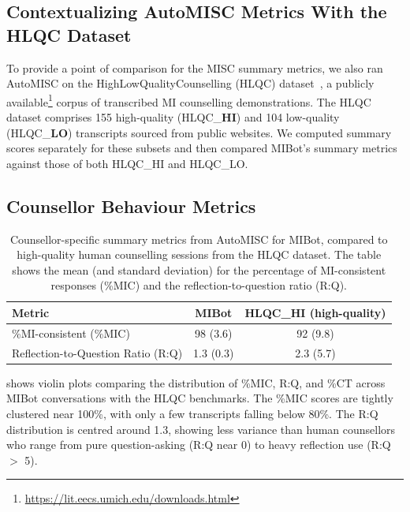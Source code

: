 \subsection{Contextualizing AutoMISC Metrics With the HLQC Dataset}
To provide a point of comparison for the MISC summary metrics, we also ran AutoMISC on the HighLowQualityCounselling (HLQC) dataset~\cite{perez-rosas-etal-2019-makes}, a publicly available\footnote{\url{https://lit.eecs.umich.edu/downloads.html}} corpus of transcribed MI counselling demonstrations. The HLQC dataset comprises 155 high-quality (HLQC\_\textbf{HI}) and 104 low-quality (HLQC\_\textbf{LO}) transcripts sourced from public websites.
We computed summary scores separately for these subsets and then compared MIBot's summary metrics against those of both HLQC\_HI and HLQC\_LO.

\subsection{Counsellor Behaviour Metrics}
\begin{table}[ht]
	\centering
	\small
	\setlength{\tabcolsep}{4pt}
	\renewcommand{\arraystretch}{1.1}
	\begin{tabular}{@{}lcc@{}}
		\toprule
		\textbf{Metric}                    & \textbf{MIBot} & \textbf{HLQC\_HI (high-quality)} \\
		\midrule
		\%MI-consistent (\%MIC)            & 98 (3.6)       & 92 (9.8)                         \\
		Reflection-to-Question Ratio (R:Q) & 1.3 (0.3)      & 2.3 (5.7)                        \\
		\bottomrule
	\end{tabular}
	\caption[AutoMISC Counsellor Metrics for MIBot vs. Human]{Counsellor-specific summary metrics from AutoMISC for MIBot, compared to high-quality human counselling sessions from the HLQC dataset. The table shows the mean (and standard deviation) for the percentage of MI-consistent responses (\%MIC) and the reflection-to-question ratio (R:Q).}
	\label{table:automisc_summary}
\end{table}

 shows violin plots comparing the distribution of \%MIC, R:Q, and \%CT across MIBot conversations with the HLQC benchmarks. The \%MIC scores are tightly clustered near 100\%, with only a few transcripts falling below 80\%. The R:Q distribution is centred around 1.3, showing less variance than human counsellors who range from pure question-asking (R:Q near 0) to heavy reflection use (R:Q $>$ 5).

